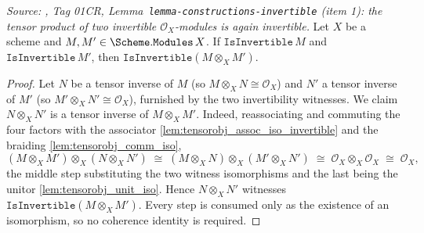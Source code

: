\begin{lemma}\leanok
  \label{lem:isinvertible_tensor}
  \textit{Source: \cite{stacks-project}, Tag 01CR,
  Lemma~\texttt{lemma-constructions-invertible} (item 1): the tensor product of two
  invertible \(\mathcal{O}_X\)-modules is again invertible.}
  Let \(X\) be a scheme and \(M, M' \in \Scheme.\mathtt{Modules}\,X\). If
  \(\mathtt{IsInvertible}\,M\) and \(\mathtt{IsInvertible}\,M'\), then
  \(\mathtt{IsInvertible}(M \otimes_X M')\).
\end{lemma}

\begin{proof}
  \leanok
  Let \(N\) be a tensor inverse of \(M\) (so \(M \otimes_X N \cong \mathcal{O}_X\))
  and \(N'\) a tensor inverse of \(M'\) (so \(M' \otimes_X N' \cong \mathcal{O}_X\)),
  furnished by the two invertibility witnesses. We claim \(N \otimes_X N'\) is a
  tensor inverse of \(M \otimes_X M'\). Indeed, reassociating and commuting the four
  factors with the associator \cref{lem:tensorobj_assoc_iso_invertible} and the
  braiding \cref{lem:tensorobj_comm_iso},
  \[
    (M \otimes_X M') \otimes_X (N \otimes_X N')
    \;\cong\;
    (M \otimes_X N) \otimes_X (M' \otimes_X N')
    \;\cong\;
    \mathcal{O}_X \otimes_X \mathcal{O}_X
    \;\cong\;
    \mathcal{O}_X,
  \]
  the middle step substituting the two witness isomorphisms and the last being the
  unitor \cref{lem:tensorobj_unit_iso}. Hence \(N \otimes_X N'\) witnesses
  \(\mathtt{IsInvertible}(M \otimes_X M')\). Every step is consumed only as the
  existence of an isomorphism, so no coherence identity is required.
\end{proof}

